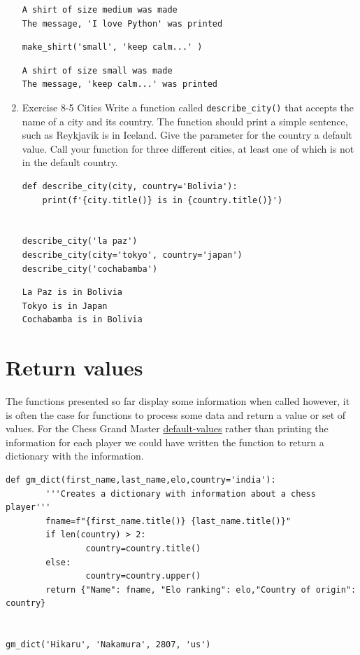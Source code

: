 \documentclass[10pt]{book}
\begin{document}
\begin{enumerate}
\label{orga846a05}
\begin{verbatim}
A shirt of size medium was made
The message, 'I love Python' was printed
\end{verbatim}

\begin{verbatim}
make_shirt('small', 'keep calm...' )
\end{verbatim}

\label{orgfdc926e}
\begin{verbatim}
A shirt of size small was made
The message, 'keep calm...' was printed
\end{verbatim}
\item Exercise 8-5 Cities
\label{sec:orgaabd270}
Write a function called \texttt{describe\_city()} that accepts the name of a city and its country. The function should print a simple sentence, such as Reykjavik is in Iceland. Give the parameter for the country a default value. Call your function for three different cities, at least one of which is not in the default country.
\begin{verbatim}
def describe_city(city, country='Bolivia'):
    print(f'{city.title()} is in {country.title()}')


describe_city('la paz')
describe_city(city='tokyo', country='japan')
describe_city('cochabamba')
\end{verbatim}

\label{org443c20f}
\begin{verbatim}
La Paz is in Bolivia
Tokyo is in Japan
Cochabamba is in Bolivia
\end{verbatim}
\end{enumerate}
\section{Return values}
\label{sec:orgb54f49e}
The functions presented so far display some information when called however, it is often the case for functions to process some data and return a value or set of values. For the Chess Grand Master \hyperref[org740afa4]{default-values} rather than printing the information for each player we could have written the function to return a dictionary with the information.

\label{orgbff5f6a}
\begin{verbatim}
def gm_dict(first_name,last_name,elo,country='india'):
        '''Creates a dictionary with information about a chess player'''
        fname=f"{first_name.title()} {last_name.title()}"
        if len(country) > 2:
                country=country.title()
        else:
                country=country.upper()
        return {"Name": fname, "Elo ranking": elo,"Country of origin": country}


gm_dict('Hikaru', 'Nakamura', 2807, 'us')
\end{verbatim}
\end{document}

